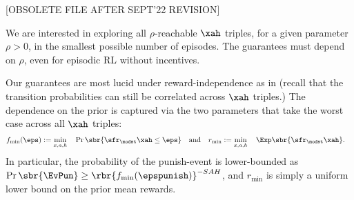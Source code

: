 
[OBSOLETE FILE AFTER SEPT'22 REVISION]

We are interested in exploring all $\rho$-reachable $\xah$ triples, for a given parameter $\rho>0$, in the smallest possible number of episodes. The guarantees must depend on $\rho$, even for episodic RL without incentives.


Our guarantees are most lucid under reward-independence as in  (recall that the transition probabilities can still be correlated across $\xah$ triples.) The dependence on the prior is  captured via the two parameters that take the worst case across all $\xah$ triples:
%
%
%
%
\begin{align}\label{eq:fmin_argmin}
f_{\min}(\eps) &:= \min_{x,a,h}\quad
    \Pr\sbr{ \sfr_{\modst}\xah \le \eps}
\quad\text{and}\quad
r_{\min} := \min_{x,a,h}\quad
    \Exp\sbr{ \sfr_{\modst}\xah }.
\end{align}
In particular, the probability of the punish-event is lower-bounded as
    $\Pr\sbr{\EvPun} \geq \rbr{f_{\min}(\epspunish)}^{-SAH}$,
and $r_{\min}$ is simply a uniform lower bound on the prior mean rewards.

